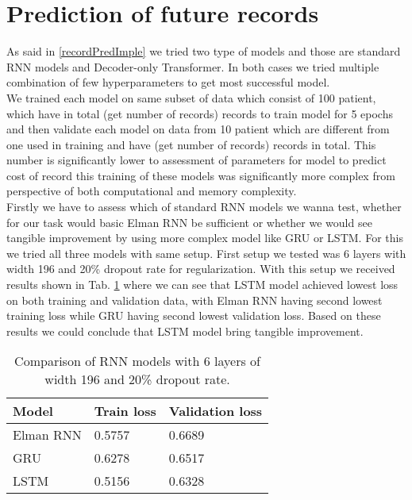 
\section{Prediction of future records}
\label{recordPredRes}

As said in \ref{recordPredImple} we tried two type of models and those are standard RNN models and Decoder-only Transformer. In both cases we tried multiple combination of few hyperparameters to get most successful model. 
\\

We trained each model on same subset of data which consist of 100 patient, which have in total (get number of records) records to train model for 5 epochs and then validate each model on data from 10 patient which are different from one used in training and have (get number of records) records in total. This number is significantly lower to assessment of parameters for model to predict cost of record this training of these models was significantly more complex from perspective of both computational and memory complexity.
\\

Firstly we have to assess which of standard RNN models we wanna test, whether for our task would basic Elman RNN be sufficient or whether we would see tangible improvement by using more complex model like GRU or LSTM. For this we tried all three models with same setup. First setup we tested was 6 layers with width 196 and 20\% dropout rate for regularization. With this setup we received results shown in Tab. \ref{tab:rnn_comp_1} where we can see that LSTM model achieved lowest loss on both training and validation data, with Elman RNN having second lowest training loss while GRU having second lowest validation loss. Based on these results we could conclude that LSTM model bring tangible improvement.
\\ 

\begin{table}[!h]
  	\centering
  	\begin{tabular}{|l|l|l|}
  		\hline
  		Model        & Train loss      & Validation loss \\ \hline
  	    Elman RNN    &  0.5757         & 0.6689          \\ \hline      
  		GRU          &  0.6278         & 0.6517          \\ \hline           
  		LSTM         &  0.5156         & 0.6328          \\ \hline
  	\end{tabular}
  	\caption{Comparison of RNN models with 6 layers of width 196 and 20\% dropout rate.}
  	\label{tab:rnn_comp_1}
\end{table}

